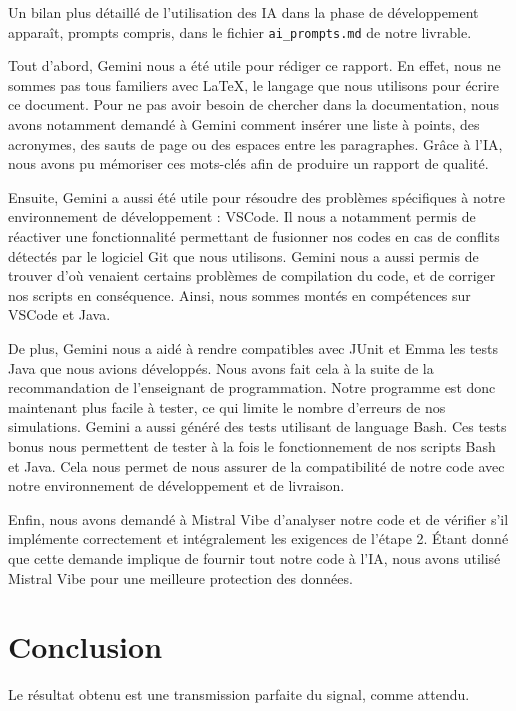 \documentclass[a4paper,12pt]{report}
\begin{document}
Un bilan plus détaillé de l'utilisation des IA dans la phase de développement apparaît, prompts compris, dans le fichier \verb|ai_prompts.md| de notre livrable.

Tout d'abord, Gemini nous a été utile pour rédiger ce rapport. En effet, nous ne sommes pas tous familiers avec LaTeX, le langage que nous utilisons pour écrire ce document. Pour ne pas avoir besoin de chercher dans la documentation, nous avons notamment demandé à Gemini comment insérer une liste à points, des acronymes, des sauts de page ou des espaces entre les paragraphes. Grâce à l'IA, nous avons pu mémoriser ces mots-clés afin de produire un rapport de qualité.

Ensuite, Gemini a aussi été utile pour résoudre des problèmes spécifiques à notre environnement de développement : VSCode. Il nous a notamment permis de réactiver une fonctionnalité permettant de fusionner nos codes en cas de conflits détectés par le logiciel Git que nous utilisons. Gemini nous a aussi permis de trouver d'où venaient certains problèmes de compilation du code, et de corriger nos scripts en conséquence. Ainsi, nous sommes montés en compétences sur VSCode et Java.

De plus, Gemini nous a aidé à rendre compatibles avec JUnit et Emma les tests Java que nous avions développés. Nous avons fait cela à la suite de la recommandation de l'enseignant de programmation. Notre programme est donc maintenant plus facile à tester, ce qui limite le nombre d'erreurs de nos simulations. Gemini a aussi généré des tests utilisant de language Bash. Ces tests bonus nous permettent de tester à la fois le fonctionnement de nos scripts Bash et Java. Cela nous permet de nous assurer de la compatibilité de notre code avec notre environnement de développement et de livraison.

Enfin, nous avons demandé à Mistral Vibe d'analyser notre code et de vérifier s'il implémente correctement et intégralement les exigences de l'étape 2. Étant donné que cette demande implique de fournir tout notre code à l'IA, nous avons utilisé Mistral Vibe pour une meilleure protection des données.

\pagebreak

\section{Conclusion}

Le résultat obtenu est une transmission parfaite du signal, comme attendu. 
\end{document}
